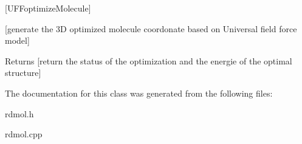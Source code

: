 \mbox{[}U\+F\+Foptimize\+Molecule\mbox{]} 

\mbox{[}generate the 3\+D optimized molecule coordonate based on Universal field force model\mbox{]}

\begin{DoxyReturn}{Returns}
\mbox{[}return the status of the optimization and the energie of the optimal structure\mbox{]} 
\end{DoxyReturn}


The documentation for this class was generated from the following files\+:\begin{DoxyCompactItemize}
\item 
rdmol.\+h\item 
rdmol.\+cpp\end{DoxyCompactItemize}
